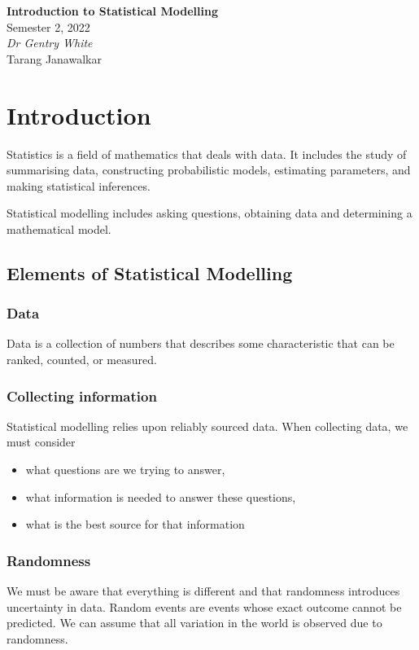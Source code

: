 \documentclass{article}
\date{}
\newcommand{\unitName}{Introduction to Statistical Modelling}
\newcommand{\unitTime}{Semester 2, 2022}
\newcommand{\unitCoordinator}{Dr Gentry White}
\newcommand{\documentAuthors}{Tarang Janawalkar}
\begin{document}
%
\begin{titlepage}
    \vspace*{\fill}
    \begin{center}
        \LARGE{\textbf{\unitName}} \\[0.1in]
        \normalsize{\unitTime} \\[0.2in]
        \normalsize\textit{\unitCoordinator} \\[0.2in]
        \documentAuthors
    \end{center}
    \vspace*{\fill}
    \doclicenseThis
    \thispagestyle{empty}
\end{titlepage}
\newpage
%
\tableofcontents
\newpage
%
\section{Introduction}
Statistics is a field of mathematics that deals with data.
It includes the study of summarising data, constructing probabilistic models, estimating
parameters, and making statistical inferences.

Statistical modelling includes asking questions, obtaining data and determining a mathematical model.
\subsection{Elements of Statistical Modelling}
\subsubsection{Data}
Data is a collection of numbers that describes some characteristic that can be ranked, counted, or measured.
\subsubsection{Collecting information}
Statistical modelling relies upon reliably sourced data. When collecting data,
we must consider
\begin{itemize}
    \item what questions are we trying to answer,
    \item what information is needed to answer these questions,
    \item what is the best source for that information
\end{itemize}
\subsubsection{Randomness}
We must be aware that everything is different and that
randomness introduces uncertainty in data.
Random events are events whose exact outcome cannot be predicted.
We can assume that all variation in the world is observed due to randomness.
\end{document}
